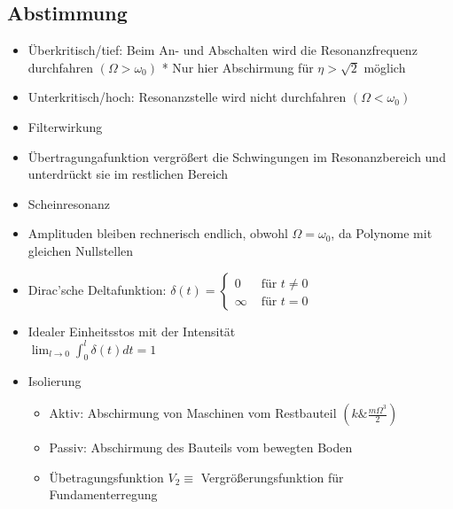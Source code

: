 \documentclass[fleqn,twoside]{article}
\begin{document}
\begin{multicols*}{3}
\subsection{Abstimmung}
\begin{itemize}
    \item Überkritisch/tief: Beim An- und Abschalten wird die Resonanzfrequenz durchfahren $\left(\Omega>\omega_0\right)$ * Nur hier Abschirmung für $\eta>\sqrt{2}$ möglich
    \item Unterkritisch/hoch: Resonanzstelle wird nicht durchfahren $\left(\Omega<\omega_0\right)$
    \item Filterwirkung
    \item Übertragungafunktion vergrößert die Schwingungen im Resonanzbereich und unterdrückt sie im restlichen Bereich
    \item Scheinresonanz
    \item Amplituden bleiben rechnerisch endlich, obwohl $\Omega=\omega_0$, da Polynome mit gleichen Nullstellen
    \item Dirac'sche Deltafunktion: $\delta(t)= \begin{cases}0 & \text { für } t \neq 0 \\ \infty & \text { für } t=0\end{cases}$
    \item Idealer Einheitsstos mit der Intensität \\ $\lim _{l \rightarrow 0} \int_0^l \delta(t) d t=1$





\item Isolierung
    \begin{itemize}
        \item Aktiv: Abschirmung von Maschinen vom Restbauteil $\left(k \& \frac{m \Omega^3}{2}\right)$
        \item Passiv: Abschirmung des Bauteils vom bewegten Boden
        \item Übetragungsfunktion $V_2 \equiv$ Vergrößerungsfunktion für Fundamenterregung
    \end{itemize}
\end{itemize}



\end{multicols*}
\end{document}

